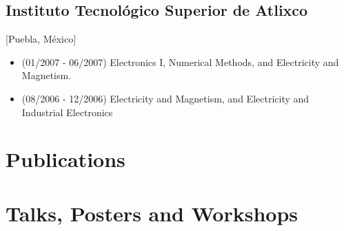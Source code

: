 \documentclass{mycv}
\begin{document}
\subsection{Instituto Tecnol\'ogico Superior de Atlixco}[Puebla, M\'exico]
\vspace{1mm}
\begin{positions}
\end{positions}
\begin{itemize}
	I led curriculum preparaton, topic presentation and preparation for student evaluation
	\vspace{-1mm}
	\item (01/2007 - 06/2007) Electronics I, Numerical Methods, and Electricity and Magnetism. 
	\item (08/2006 - 12/2006) Electricity and Magnetism, and Electricity and Industrial Electronics 
\end{itemize}

\section{Publications}

\section{Talks, Posters and Workshops}

\end{document}
